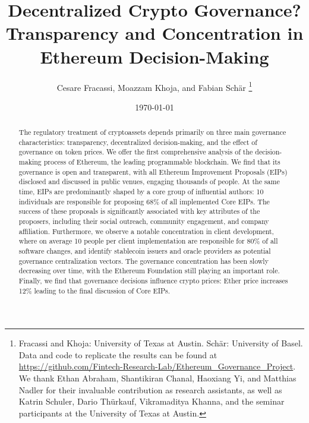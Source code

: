 \documentclass[No]{AEA}
\begin{document}
\title{Decentralized Crypto Governance? \\ Transparency and Concentration in Ethereum Decision-Making}
\author{Cesare Fracassi, Moazzam Khoja, and Fabian Sch\"{a}r \thanks{Fracassi and Khoja: University of Texas at Austin. Sch\"{a}r: University of Basel. Data and code to replicate the results can be found at \url{https://github.com/Fintech-Research-Lab/Ethereum_Governance_Project}. We thank Ethan Abraham, Shantikiran Chanal, Haoxiang Yi, and Matthias Nadler for their invaluable contribution as research assistants, as well as Katrin Schuler, Dario Thürkauf, Vikramaditya Khanna, and the seminar participants at the University of Texas at Austin.}}
\date{\today}
\JEL{}
\Keywords{}



\begin{abstract}
The regulatory treatment of cryptoassets depends primarily on three main governance characteristics: transparency, decentralized decision-making, and the effect of governance on token prices. We offer the first comprehensive analysis of the decision-making process of Ethereum, the leading programmable blockchain. We find that its governance is open and transparent, with all Ethereum Improvement Proposals (EIPs) disclosed and discussed in public venues, engaging thousands of people. At the same time, EIPs are predominantly shaped by a core group of influential authors: 10 individuals are responsible for proposing 68\% of all implemented Core EIPs. The success of these proposals is significantly associated with key attributes of the proposers, including their social outreach, community engagement, and company affiliation. Furthermore, we observe a notable concentration in client development, where on average 10 people per client implementation are responsible for 80\% of all software changes, and identify stablecoin issuers and oracle providers as potential governance centralization vectors. The governance concentration has been slowly decreasing over time, with the Ethereum Foundation still playing an important role. Finally, we find that governance decisions influence crypto prices: Ether price increases 12\% leading to the final discussion of Core EIPs.
\end{abstract}
\end{document}
